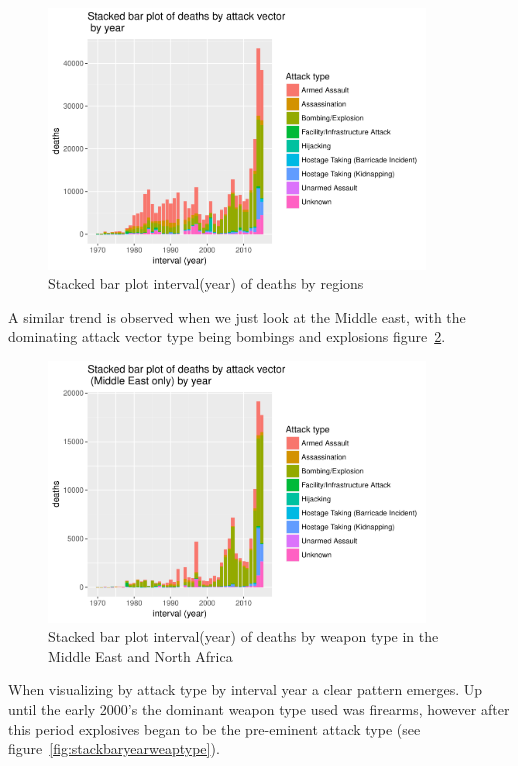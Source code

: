 \begin{figure}[t]
\includegraphics[width=10cm]{Peters_experiment_markdown_files/figure-latex/unnamed-chunk-7-1.pdf}
\caption{Stacked bar plot interval(year) of deaths by regions}
\label{fig:stackbaryearattackvector1}
\centering
\end{figure}

A similar trend is observed when we just look at the Middle east, with the dominating attack vector type being bombings and explosions figure~\ref{fig:stackbaryearattackvectormideast}.

\begin{figure}[t]
\includegraphics[width=10cm]{Peters_experiment_markdown_files/figure-latex/unnamed-chunk-8-1.pdf}
\caption{Stacked bar plot interval(year) of deaths by weapon type in the Middle East and North Africa}
\label{fig:stackbaryearattackvectormideast}
\centering
\end{figure}

When visualizing by attack type by interval year a clear pattern emerges. Up until the early 2000's the dominant weapon type used was firearms, however after this period explosives began to be the pre-eminent attack type (see figure~\ref{fig:stackbaryearweaptype}). 

